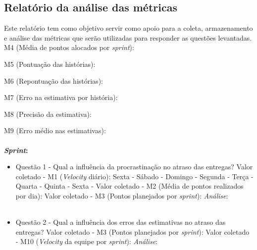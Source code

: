 \begin{apendicesenv}
	      
	\chapter{Relatório da análise das métricas}
	\label{relatorio_template}

	Este relatório tem como objetivo servir como apoio para a coleta, armazenamento e análise das métricas que serão 
	utilizadas para responder as questões levantadas.
	\\
	

	M4 (Média de pontos alocados por \textit{sprint}): \underline{ }\underline{ }\underline{ }
	
	M5 (Pontuação das histórias):  \underline{ }\underline{ }\underline{ }
	
	M6 (Repontuação das histórias): \underline{ }\underline{ }\underline{ }
	
	M7 (Erro na estimativa por história): \underline{ }\underline{ }\underline{ }
	
	M8 (Precisão da estimativa): \underline{ }\underline{ }\underline{ }
	
	M9 (Erro médio nas estimativas): \underline{ }\underline{ }\underline{ }
	\\
	\\
	\textbf{\textit{Sprint}: \underline{ }\underline{ }\underline{ }}
	
	\begin{itemize}
	  
	  \item Questão 1 - Qual a influência da procrastinação no atraso das entregas?
	    \subitem Valor coletado - M1 (\textit{Velocity} diário):
	      \subsubitem Sexta -
	      \subsubitem Sábado -
	      \subsubitem Domingo -
	      \subsubitem Segunda -
	      \subsubitem Terça -
	      \subsubitem Quarta -
	      \subsubitem Quinta -
	      \subsubitem Sexta - 
	    \subitem Valor coletado - M2 (Média de pontos realizados por dia): 
	    \subitem Valor coletado - M3 (Pontos planejados por \textit{sprint}):
	    \subitem \textit{Análise}:
	    \\
	    \\
	    \vfill
	    \pagebreak

	  \item Questão 2 - Qual a influência dos erros das estimativas no atraso das entregas? 
	    \subitem Valor coletado - M3 (Pontos planejados por \textit{sprint}):
	    \subitem Valor coletado - M10 (\textit{Velocity} da equipe por \textit{sprint}):
	    \subitem \textit{Análise}:
	    \\
	    \\
	    

\end{itemize}
\end{apendicesenv}
